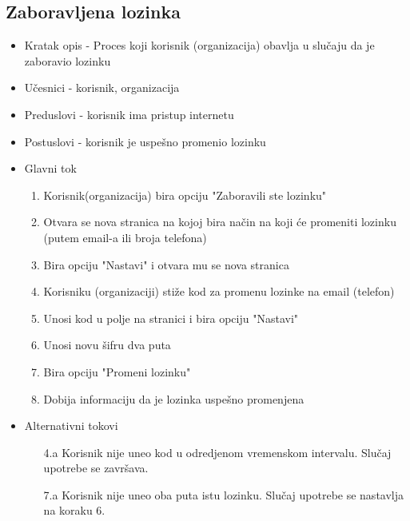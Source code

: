 \subsection{Zaboravljena lozinka}
\begin{itemize}
    \item Kratak opis - Proces koji korisnik (organizacija) obavlja u slučaju da je zaboravio lozinku
    \item Učesnici - korisnik, organizacija
    \item Preduslovi - korisnik ima pristup internetu
    \item Postuslovi - korisnik je uspešno promenio lozinku
    \item Glavni tok
        \begin{enumerate}
	        \item Korisnik(organizacija) bira opciju "Zaboravili ste lozinku"
	        \item Otvara se nova stranica na kojoj bira način na koji će promeniti lozinku (putem email-a ili broja telefona)
	        \item Bira opciju "Nastavi" i otvara mu se nova stranica
	        \item Korisniku (organizaciji) stiže kod za promenu lozinke na email (telefon)
	        \item Unosi kod u polje na stranici i bira opciju "Nastavi"
	        \item Unosi novu šifru dva puta
	        \item Bira opciju "Promeni lozinku"
	        \item Dobija informaciju da je lozinka uspešno promenjena
        \end{enumerate}
    \item Alternativni tokovi
        \begin{itemize}
            \item[4.a] Korisnik nije uneo kod u odredjenom vremenskom intervalu. Slučaj upotrebe se završava.
            \item[7.a] Korisnik nije uneo oba puta istu lozinku. Slučaj upotrebe se nastavlja na koraku 6.
            
        \end{itemize}
\end{itemize}

